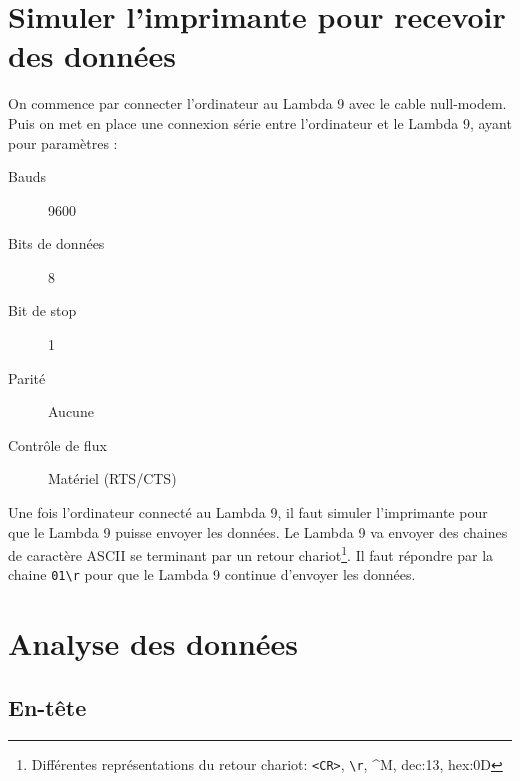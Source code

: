 \documentclass[a4paper, 12pt]{article}
\begin{document}
\newpage
\section{Simuler l'imprimante pour recevoir des données}\label{simuler}


On commence par connecter l'ordinateur au Lambda 9 avec le cable null-modem.
Puis on met en place une connexion série entre l'ordinateur et le Lambda 9, ayant pour paramètres :
\begin{description}
	\item[Bauds] 9600 
	\item[Bits de données] 8 
	\item[Bit de stop] 1 
	\item[Parité] Aucune
	\item[Contrôle de flux] Matériel (RTS/CTS)
\end{description}


Une fois l'ordinateur connecté au Lambda 9, il faut simuler l'imprimante pour que le Lambda 9 puisse envoyer les données.
Le Lambda 9 va envoyer des chaines de caractère ASCII se terminant par un retour chariot\footnote{Différentes représentations du retour chariot: \texttt{<CR>},  \texttt{\textbackslash r}, \^{}M, dec:13, hex:0D}.
Il faut répondre par la chaine \verb|01\r| pour que le Lambda 9 continue d'envoyer les données.

\newpage
\section{Analyse des données}\label{analyse}

\subsection{En-tête}\label{en-tete}
\end{document}
